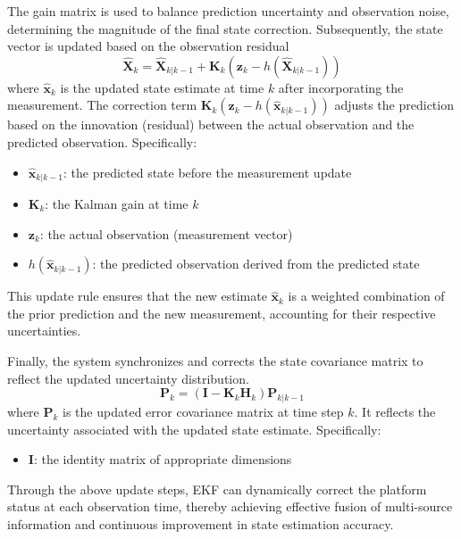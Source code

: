 \documentclass[12pt,a4paper]{article}
\numberwithin{equation}{section}
\begin{document}
The gain matrix is used to balance prediction uncertainty and observation noise,
determining the magnitude of the final state correction. Subsequently, the state
vector is updated based on the observation residual
\begin{equation}
  \hat{\mathbf{X}}_k = \hat{\mathbf{X}}_{k|k-1} + \mathbf{K}_k 
  \left( \mathbf{z}_k - h(\hat{\mathbf{X}}_{k|k-1}) \right)
  \label{eq:state_update}
\end{equation}
where $\hat{\mathbf{x}}_k$ is the updated state estimate at time $k$ after
incorporating the measurement. The correction term
$\mathbf{K}_k \left( \mathbf{z}_k - h(\hat{\mathbf{x}}_{k|k-1}) \right)$ adjusts
the prediction based on the innovation (residual) between the actual observation
and the predicted observation. Specifically:
\begin{itemize}
\item $\hat{\mathbf{x}}_{k|k-1}$: the predicted state before the measurement
  update
\item $\mathbf{K}_k$: the Kalman gain at time $k$
\item $\mathbf{z}_k$: the actual observation (measurement vector)
\item $h(\hat{\mathbf{x}}_{k|k-1})$: the predicted observation derived from the
  predicted state
\end{itemize}

This update rule ensures that the new estimate $\hat{\mathbf{x}}_k$ is a
weighted combination of the prior prediction and the new measurement, accounting
for their respective uncertainties.

Finally, the system synchronizes and corrects the state covariance matrix to
reflect the updated uncertainty distribution.
\begin{equation}
  \mathbf{P}_k = (\mathbf{I} - \mathbf{K}_k \mathbf{H}_k) \mathbf{P}_{k|k-1}
  \label{eq:cov_update}
\end{equation}
\noindent
where $\mathbf{P}_k$ is the updated error covariance matrix at time step $k$. It
reflects the uncertainty associated with the updated state
estimate. Specifically:
\begin{itemize}
  \item $\mathbf{I}$: the identity matrix of appropriate dimensions
\end{itemize}

Through the above update steps, EKF can dynamically correct the platform status
at each observation time, thereby achieving effective fusion of multi-source
information and continuous improvement in state estimation accuracy.
\end{document}
